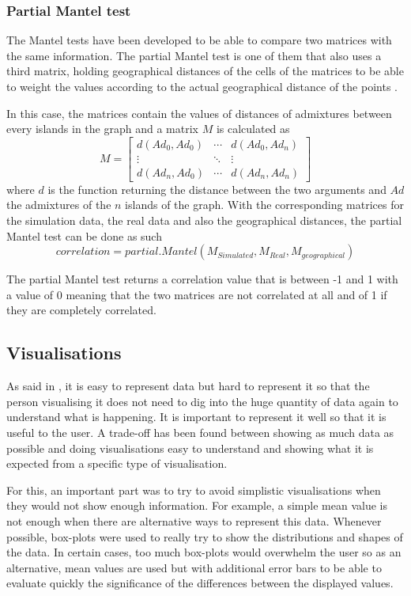 \documentclass[a4paper,12pt]{report}
\begin{document}
\subsubsection{Partial Mantel test}
The Mantel tests have been developed to be able to compare two matrices with the same information. The partial Mantel test is one of them that also uses a third matrix, holding geographical distances of the cells of the matrices to be able to weight the values according to the actual geographical distance of the points \cite{Smo01}.

In this case, the matrices contain the values of distances of admixtures between every islands in the graph and a matrix $M$ is calculated as
\begin{equation}
	M = \begin{bmatrix}
		d(Ad_0, Ad_0)	& \cdots & d(Ad_0, Ad_n) \\
		\vdots			& \ddots & \vdots		 \\
		d(Ad_n, Ad_0)	& \cdots & d(Ad_n, Ad_n)
	\end{bmatrix}
\end{equation}
where $d$ is the function returning the distance between the two arguments and $Ad$ the admixtures of the $n$ islands of the graph. With the corresponding matrices for the simulation data, the real data and also the geographical distances, the partial Mantel test can be done as such
\begin{equation}
	correlation = partial.Mantel(M_{Simulated}, M_{Real}, M_{geographical})
\end{equation}

The partial Mantel test returns a correlation value that is between -1 and 1 with a value of 0 meaning that the two matrices are not correlated at all and of 1 if they are completely correlated.

\subsection{Visualisations}
As said in \cite{Wei01}, it is easy to represent data but hard to represent it so that the person visualising it does not need to dig into the huge quantity of data again to understand what is happening. It is important to represent it well so that it is useful to the user. A trade-off has been found between showing as much data as possible and doing visualisations easy to understand and showing what it is expected from a specific type of visualisation.

For this, an important part was to try to avoid simplistic visualisations when they would not show enough information. For example, a simple mean value is not enough when there are alternative ways to represent this data. Whenever possible, box-plots were used to really try to show the distributions and shapes of the data. In certain cases, too much box-plots would overwhelm the user so as an alternative, mean values are used but with additional error bars to be able to evaluate quickly the significance of the differences between the displayed values.
\end{document}
